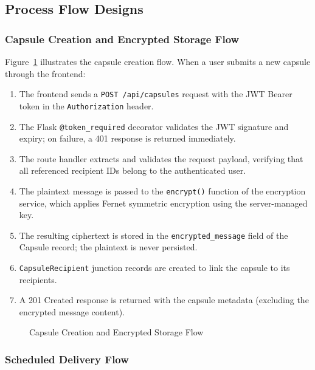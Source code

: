 \documentclass[12pt, a4paper]{article}
\begin{document}
\subsection{Process Flow Designs}

\subsubsection{Capsule Creation and Encrypted Storage Flow}

Figure~\ref{fig:capsule_creation} illustrates the capsule creation flow. When a user submits a new capsule through the frontend:

\begin{enumerate}
  \item The frontend sends a \texttt{POST /api/capsules} request with the JWT Bearer token in the \texttt{Authorization} header.
  \item The Flask \texttt{@token\_required} decorator validates the JWT signature and expiry; on failure, a 401 response is returned immediately.
  \item The route handler extracts and validates the request payload, verifying that all referenced recipient IDs belong to the authenticated user.
  \item The plaintext message is passed to the \texttt{encrypt()} function of the encryption service, which applies Fernet symmetric encryption using the server-managed key.
  \item The resulting ciphertext is stored in the \texttt{encrypted\_message} field of the Capsule record; the plaintext is never persisted.
  \item \texttt{CapsuleRecipient} junction records are created to link the capsule to its recipients.
  \item A 201 Created response is returned with the capsule metadata (excluding the encrypted message content).
\end{enumerate}

\begin{figure}[H]
  \centering
  \caption{Capsule Creation and Encrypted Storage Flow}
  \label{fig:capsule_creation}
\end{figure}

\subsubsection{Scheduled Delivery Flow}
\end{document}
